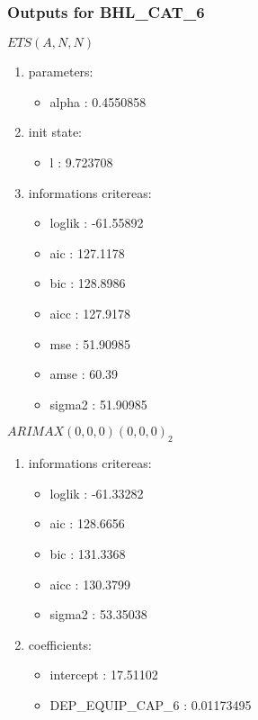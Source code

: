 \documentclass[10pt,a4paper]{article}\usepackage[]{graphicx}\usepackage[]{color}
\newcommand{\AaA}{\_}
\begin{document}
\newpage
\subsubsection{Outputs for BHL\AaA CAT\AaA 6}
\begin{multicols}{2}


$ ETS(A,N,N) $
\begin{enumerate}
\item parameters:
\begin{itemize}
\item  alpha :  0.4550858 
\end{itemize}
\item init state:
\begin{itemize}
\item  l :  9.723708 
\end{itemize}
\item informations critereas:
\begin{itemize}
\item  loglik :  -61.55892 
\item  aic :  127.1178 
\item  bic :  128.8986 
\item  aicc :  127.9178 
\item  mse :  51.90985 
\item  amse :  60.39 
\item  sigma2 :  51.90985 
\end{itemize}
\end{enumerate}

\columnbreak


 $ARIMAX(0,0,0)(0,0,0)_{2}$ 
\begin{enumerate}
\item informations critereas:
\begin{itemize}
\item  loglik :  -61.33282 
\item  aic :  128.6656 
\item  bic :  131.3368 
\item  aicc :  130.3799 
\item  sigma2 :  53.35038 
\end{itemize}

\item coefficients:
\begin{itemize}
\item  intercept :  17.51102 
\item  DEP\AaA EQUIP\AaA CAP\AaA 6 :  0.01173495 
\end{itemize}
\end{enumerate}
\end{multicols}
\end{document}
